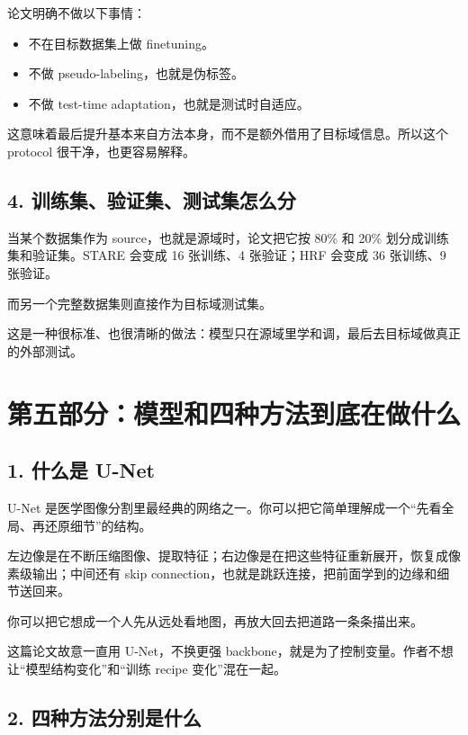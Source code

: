 \documentclass[12pt,a4paper]{ctexart}
\begin{document}
论文明确不做以下事情：

\begin{itemize}[leftmargin=1.6em]
  \item 不在目标数据集上做 finetuning。
  \item 不做 pseudo-labeling，也就是伪标签。
  \item 不做 test-time adaptation，也就是测试时自适应。
\end{itemize}

这意味着最后提升基本来自方法本身，而不是额外借用了目标域信息。所以这个 protocol 很干净，也更容易解释。

\subsection*{4. 训练集、验证集、测试集怎么分}

当某个数据集作为 source，也就是源域时，论文把它按 80\% 和 20\% 划分成训练集和验证集。STARE 会变成 16 张训练、4 张验证；HRF 会变成 36 张训练、9 张验证。

而另一个完整数据集则直接作为目标域测试集。

这是一种很标准、也很清晰的做法：模型只在源域里学和调，最后去目标域做真正的外部测试。

\section*{第五部分：模型和四种方法到底在做什么}

\subsection*{1. 什么是 U-Net}

U-Net 是医学图像分割里最经典的网络之一。你可以把它简单理解成一个“先看全局、再还原细节”的结构。

左边像是在不断压缩图像、提取特征；右边像是在把这些特征重新展开，恢复成像素级输出；中间还有 skip connection，也就是跳跃连接，把前面学到的边缘和细节送回来。

你可以把它想成一个人先从远处看地图，再放大回去把道路一条条描出来。

这篇论文故意一直用 U-Net，不换更强 backbone，就是为了控制变量。作者不想让“模型结构变化”和“训练 recipe 变化”混在一起。

\subsection*{2. 四种方法分别是什么}
\end{document}
